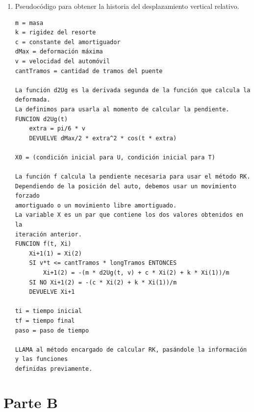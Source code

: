 \documentclass[10.5pt]{article}
\begin{document}
\begin{enumerate}
 \item Pseudocódigo para obtener la historia del desplazamiento vertical relativo.
 \begin{verbatim}
m = masa
k = rigidez del resorte
c = constante del amortiguador
dMax = deformación máxima
v = velocidad del automóvil
cantTramos = cantidad de tramos del puente
 
La función d2Ug es la derivada segunda de la función que calcula la deformada.
La definimos para usarla al momento de calcular la pendiente.
FUNCION d2Ug(t) 
    extra = pi/6 * v
    DEVUELVE dMax/2 * extra^2 * cos(t * extra)

X0 = (condición inicial para U, condición inicial para T)

La función f calcula la pendiente necesaria para usar el método RK.
Dependiendo de la posición del auto, debemos usar un movimiento forzado
amortiguado o un movimiento libre amortiguado.
La variable X es un par que contiene los dos valores obtenidos en la
iteración anterior.
FUNCION f(t, Xi)
    Xi+1(1) = Xi(2)
    SI v*t <= cantTramos * longTramos ENTONCES
        Xi+1(2) = -(m * d2Ug(t, v) + c * Xi(2) + k * Xi(1))/m
    SI NO Xi+1(2) = -(c * Xi(2) + k * Xi(1))/m
    DEVUELVE Xi+1

ti = tiempo inicial
tf = tiempo final
paso = paso de tiempo

LLAMA al método encargado de calcular RK, pasándole la información y las funciones
definidas previamente.
\end{verbatim}

\end{enumerate}


\section*{Parte B}
\end{document}
